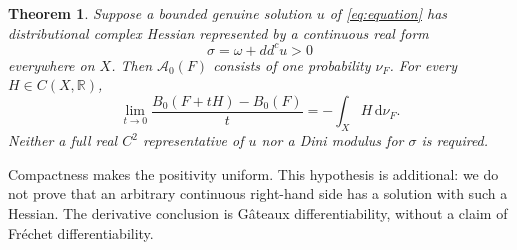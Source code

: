 \documentclass[11pt]{article}
\newcommand{\ddc}{dd^c}
\newcommand{\cA}{\mathcal A}
\newtheorem{theorem}{Theorem}
\theoremstyle{remark}
\begin{document}
\begin{theorem}\label{thm:criterion}
Suppose a bounded genuine solution $u$ of \eqref{eq:equation} has
distributional complex Hessian represented by a continuous real form
\[
 \sigma=\omega+\ddc u>0
\]
everywhere on $X$. Then $\cA_0(F)$ consists of one probability $\nu_F$.
For every $H\in C(X,\mathbb R)$,
\[
 \lim_{t\to0}\frac{B_0(F+tH)-B_0(F)}{t}
       =-\int_XH\,\mathrm d\nu_F.
\]
Neither a full real $C^2$ representative of $u$ nor a Dini modulus for
$\sigma$ is required.
\end{theorem}
Compactness makes the positivity uniform. This hypothesis is additional:
we do not prove that an arbitrary continuous right-hand side has a solution
with such a Hessian. The derivative conclusion is G\^ateaux differentiability,
without a claim of Fr\'echet differentiability.
\end{document}

